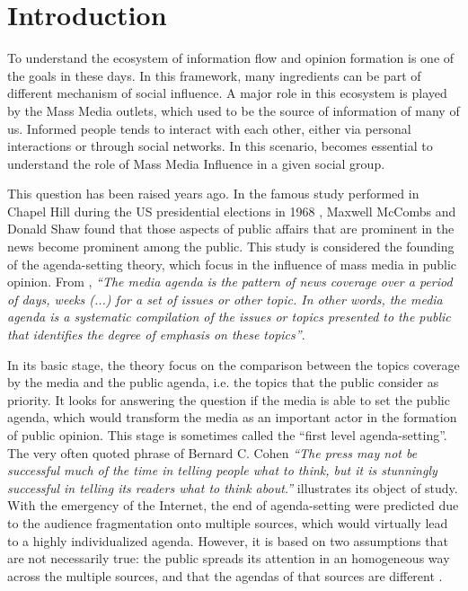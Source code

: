 \documentclass[10pt,letterpaper]{article}
\begin{document}
\section*{Introduction}
\par To understand the ecosystem of information flow and opinion formation is one of the goals in these days. In this framework, many ingredients can be part of different mechanism of social influence. A major role in this ecosystem is played by the Mass Media outlets, which used to be the source of information of many of us.  Informed people tends to interact with each other, either via personal interactions or through social networks. In this scenario, becomes essential to understand the role of Mass Media Influence in a given social group.
\par  This question has been raised years ago. In the famous study performed in Chapel Hill during the US presidential elections in 1968 \cite{mccombs1972agenda}, Maxwell McCombs and Donald Shaw found that those aspects of public affairs that are prominent in the news become prominent among the public.
This study is considered the founding of the agenda-setting theory, which focus in the influence of mass media in public opinion.  
From \cite{mccombs2014agenda}, \textit{``The media agenda is the pattern of news coverage over a period of days, weeks (...) for a set of issues or other topic. In other words, the media agenda is a systematic compilation of the issues or topics presented to the public that identifies the degree of emphasis on these topics''}. 
\par In its basic stage, the theory focus on the comparison between the topics coverage by the media and the public agenda, i.e. the topics that the public consider as priority.
It looks for answering the question if the media is able to set the public agenda, which would transform the media as an important actor in the formation of public opinion. 
This stage is sometimes called the ``first level agenda-setting''.  The very often quoted phrase of Bernard C. Cohen \textit{``The press may not be successful much of the time in telling people what to think, but it is stunningly successful in telling its readers what to think about.''} illustrates its object of study. With the emergency of the Internet, the end of agenda-setting were predicted due to the audience fragmentation onto multiple sources, which would virtually lead to a highly individualized agenda. However, it is based on two assumptions that are not necessarily true: the public spreads its attention in an homogeneous way across the multiple sources, and that the agendas of that sources are different \cite{mccombs2005look}.
\end{document}

